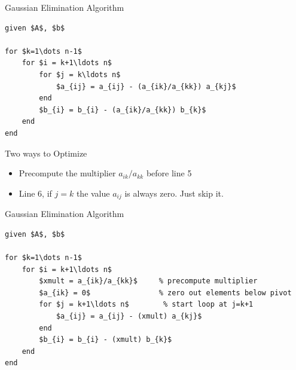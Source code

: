 \documentclass[10pt]{beamer}
\begin{document}
\begin{frame}[fragile]{Gaussian Elimination Algorithm}

\begin{lstlisting}[mathescape,label=algo:fwdelimb]
given $A$, $b$
                           
for $k=1\dots n-1$          
    for $i = k+1\ldots n$      
        for $j = k\ldots n$      
            $a_{ij} = a_{ij} - (a_{ik}/a_{kk}) a_{kj}$
        end                      
        $b_{i} = b_{i} - (a_{ik}/a_{kk}) b_{k}$
    end                        
end                          
\end{lstlisting}
\vspace{0.3cm}

\begin{block}{Two ways to Optimize}
    
\begin{itemize}
    \item[1.] Precompute the multiplier $a_{ik}/a_{kk}$ before line 5
    \item[2.] Line 6, if $j=k$ the value $a_{ij}$ is always zero. Just skip it.
\end{itemize}
\end{block}



\end{frame}

\begin{frame}[fragile]{Gaussian Elimination Algorithm}
\begin{lstlisting}[mathescape,label=algo:fwdelim,caption=Optimized Version]
given $A$, $b$
                               
for $k=1\dots n-1$          
    for $i = k+1\ldots n$      
        $xmult = a_{ik}/a_{kk}$     % precompute multiplier
        $a_{ik} = 0$                % zero out elements below pivot
        for $j = k+1\ldots n$        % start loop at j=k+1
            $a_{ij} = a_{ij} - (xmult) a_{kj}$
        end                      
        $b_{i} = b_{i} - (xmult) b_{k}$
    end                        
end                          
\end{lstlisting}
\vspace{3mm}

\end{frame}
\end{document}
